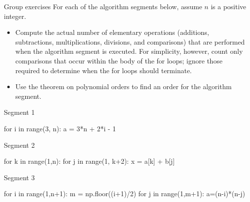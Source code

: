 \documentclass[10pt]{beamer}
\begin{document}
\begin{frame}[fragile]{Group exercises}
For each of the algorithm segments below, assume $n$ is a positive integer. 
\begin{itemize}
\item[a.] Compute the actual number of elementary operations (additions, subtractions, multiplications, divisions, and comparisons) that are performed when the algorithm segment is executed.  For simplicity, however, count only comparisons that occur within the body of the for loops; ignore those required to determine when the for loops should terminate. 
\item[b.] Use the theorem on polynomial orders to find an order for the algorithm segment.	
\end{itemize}



\centering
\begin{minipage}{0.32\textwidth}
    \centering
    \footnotesize Segment 1 \\
    \vspace{.2cm}
	\begin{python}[basicstyle=\ttfamily\scriptsize, numbers=none, columns=fullflexible, keepspaces=true]
for i in range(3, n):
    a = 3*n + 2*i - 1
	\end{python}
\end{minipage}
\hfill
\begin{minipage}{0.32\textwidth}
    \centering
    \small Segment 2 \\
      \vspace{.2cm}
	\begin{python}[basicstyle=\ttfamily\tiny, numbers=none, columns=fullflexible, keepspaces=true]
	for k in range(1,n):
		for j in range(1, k+2):
    		x = a[k] + b[j]
	\end{python}
\end{minipage}
\hfill
\begin{minipage}{0.32\textwidth}
    \centering
     \small Segment 3 \\
       \vspace{.2cm}
 	\begin{python}[basicstyle=\ttfamily\tiny, numbers=none, columns=fullflexible, keepspaces=true]
	for i in range(1,n+1):
		m = np.floor((i+1)/2)
		for j in range(1,m+1):
    		a=(n-i)*(n-j)
   	\end{python}
\end{minipage}
\end{frame}
\end{document}
